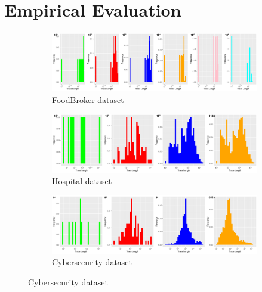 \documentclass[sigconf]{acmart}
\begin{document}


\section{Empirical Evaluation}\label{sec:empeval}

\begin{figure}[!t]
\centering
\begin{subfigure}{\textwidth}
\centering
\includegraphics[width=\textwidth]{images/BrokerPDF.png}
\caption{FoodBroker dataset}\label{fbPDF}
\end{subfigure}
\begin{subfigure}{\textwidth}
\centering
\includegraphics[width=\textwidth]{images/HospitalPDF.png}
\caption{Hospital dataset}\label{hPDF}
\end{subfigure}
\begin{subfigure}{\textwidth}
\centering
\includegraphics[width=\textwidth]{images/CyberPDF.png}
\caption{Cybersecurity dataset}\label{cPDF}
\end{subfigure}

\end{figure}
\end{document}
